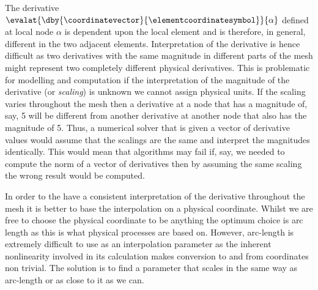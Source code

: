 
The derivative $\evalat{\dby{\coordinatevector}{\elementcoordinatesymbol}}{\alpha}$ defined at local node
$\alpha$ is dependent upon the local element \xicoord and is therefore, in
general, different in the two adjacent elements. Interpretation of the
derivative is hence difficult as two derivatives with the same magnitude in
different parts of the mesh might represent two completely different physical
derivatives. This is problematic for modelling and computation if the interpretation of the
magnitude of the derivative (or \emph{scaling}) is unknown \eg we cannot
assign physical units. If the scaling varies throughout the mesh then a
derivative at a node that has a magnitude of, say, 5 will be different from
another derivative at another node that also has the magnitude of 5. Thus, a
numerical solver that is given a vector of derivative values would assume that
the scalings are the same and interpret the magnitudes identically. This would
mean that algorithms may fail \eg if, say, we needed to compute the
norm of a vector of derivatives then by assuming the same scaling the wrong
result would be computed.

In order to the have a consistent interpretation of the derivative
throughout the mesh it is better to base the interpolation on a physical
coordinate. Whilst we are free to choose the physical coordinate to be
anything the optimum choice is arc length as this is what physical processes
are based on. However, arc-length is extremely difficult to use as an
interpolation parameter as the inherent nonlinearity involved in its
calculation makes conversion to and from coordinates non trivial.
The solution is to find a parameter that scales
in the same way as arc-length or as close to it as we can. 

